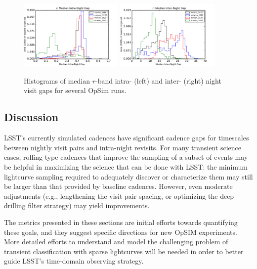 \begin{figure}[hbt]
\centerline{
	\includegraphics[width=0.45\textwidth]{figs/transients/MedianIntra-NightGap_r.pdf}
	\includegraphics[width=0.45\textwidth]{figs/transients/MedianInter-NightGap_r.pdf}
}
\caption{ Histograms of median $r$-band intra- (left) and inter- (right)
night visit gaps for several OpSim runs. }
\label{fig:tgaps_r}
\end{figure}



\subsection{Discussion}
\label{sec:\chpname:discussion}

LSST's currently simulated cadences have significant cadence gaps for
timescales between nightly visit pairs and intra-night revisits.
For many transient science cases, rolling-type cadences that improve the
sampling of a subset of events may be helpful in maximizing the science
that can be done with LSST: the minimum lightcurve sampling required to
adequately discover or characterize them may still be larger than that
provided by baseline cadences.  However, even moderate adjustments (e.g.,
lengthening the visit pair spacing, or optimizing the deep drilling filter
strategy) may yield improvements.

The metrics presented in these sections are initial efforts towards
quantifying these goals, and they suggest specific directions for new OpSIM
experiments.  More detailed efforts to understand and model
the challenging problem
of transient classification with sparse lightcurves will be needed in order
to better guide LSST's time-domain observing strategy.

